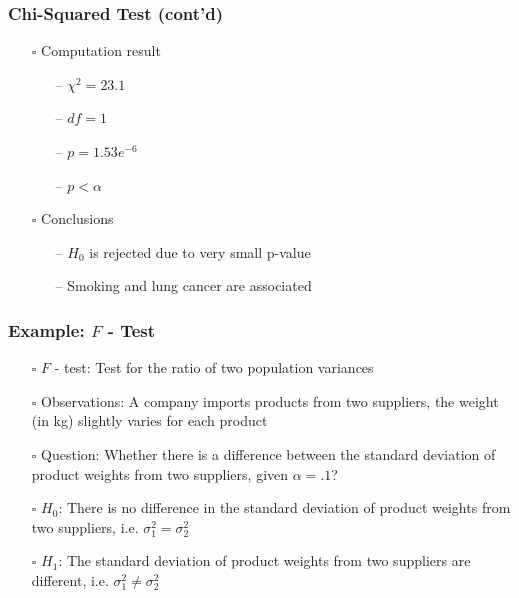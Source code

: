 \documentclass[handout]{beamer}
\begin{document}
\begin{frame}
    \frametitle{Chi-Squared Test (cont'd)}
    \begin{itemize}[wide = 0pt]
        \item[$\square$] Computation result
        \begin{itemize}
            \item[--] $\chi^2=23.1$
            \item[--] $df=1$
            \item[--] $p=1.53e^{-6}$
            \item[--] $p<\alpha$
        \end{itemize}
        \item[$\square$] Conclusions
        \begin{itemize}
            \item[--] $H_0$ is rejected due to very small p-value
            \item[--] Smoking and lung cancer are associated
        \end{itemize}
    \end{itemize} 
    \vspace*{\fill}
\end{frame}
 
 \begin{frame}
    \frametitle{Example: $F$ - Test}
    \begin{itemize}[wide = 0pt]
        \item[$\square$] $F$ - test: Test for the ratio of {\color{red}two population variances}
        \item[$\square$] Observations: A company imports products from two suppliers, the weight (in kg) slightly varies for each product
        \item[$\square$] Question: Whether there is a difference between the standard deviation of product weights from two suppliers, given $\alpha=.1$?
        \item[$\square$] $H_0$: There is no difference in the standard deviation of product weights from two suppliers, i.e. $\sigma_1^2=\sigma_2^2$
        \item[$\square$] $H_1$: The standard deviation of product weights from two suppliers are different, i.e. $\sigma_1^2\neq\sigma_2^2$
    \end{itemize} 
    \vspace*{\fill}
\end{frame}
\end{document}
